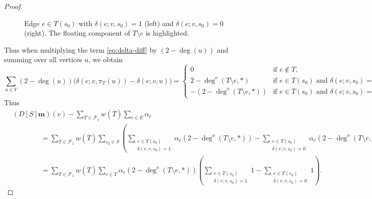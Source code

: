 \documentclass{amsart}
\theoremstyle{definition}
\newcommand{\boldm}{\mathbf{m}}
\newcommand{\trees}{\mathcal{F}_1}
\newcommand{\degout}{\deg^o}
\begin{document}
\begin{proof}
\begin{figure}[h]
\begin{minipage}{0.45\textwidth}
\end{minipage}
\caption{Edge $e \in T(s_0)$ with $\delta(e; v, s_0 ) = 1$ (left) and $\delta(e; v, s_0) = 0$ (right). The floating component of $T \setminus e$ is highlighted.}
\label{fig:e-delete-from-forest}
\end{figure}

Thus when multiplying the term \eqref{eq:delta-diff} by $(2 - \deg(u))$ and summing over all vertices $u$, we obtain
\[
	\sum_{u \in V} (2 - \deg(u)) \Big(\delta(e; v, \pi_T(u)) - \delta(e; v, u)\Big) 
	= \begin{cases}
	0 &\text{if } e \not \in T, \\
	2 - \degout(T \setminus e, *) &\text{if } e \in T(s_0) \text{ and } \delta(e; v, s_0) = 1, \\
	-(2 - \degout(T \setminus e, *)) &\text{if } e \in T(s_0) \text{ and } \delta(e; v, s_0) = 0 .
	\end{cases}
\]
Thus
\begin{align}\label{eq:1}
	&(D[S] \boldm)(v) - \sum_{T \in \trees} w(\overline{T}) \sum_{e \in E} \alpha_e \\
	&\qquad\qquad = \sum_{T\in \trees} w(\overline{T}) \sum_{s_0 \in S} \left( \sum_{\substack{e \in T(s_0) \\ \delta(e;v,s_0) = 1}} \alpha_e ( 2 - \deg^o(T\setminus e,*)) 
	- \sum_{\substack{e  \in T(s_0) \\ \delta(e;v,s_0) = 0}} \alpha_e (2 - \deg^o(T\setminus e,*) ) \right)\\
	&\qquad\qquad = \sum_{T\in \trees} w(\overline{T}) \sum_{e \in T} \alpha_e ( 2 - \deg^o(T\setminus e,*)) \left( \sum_{\substack{e \in T(s_0) \\ \delta(e;v,s_0) = 1}} 1
	- \sum_{\substack{e  \in T(s_0) \\ \delta(e;v,s_0) = 0}} 1 \right).
\end{align}


\end{proof}
\end{document}
